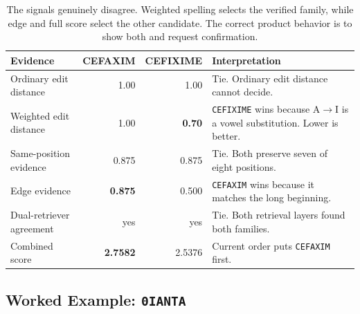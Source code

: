 \documentclass[11pt,a4paper]{article}
\newcommand{\code}[1]{\texttt{#1}}
\begin{document}
\begin{table}[H]
\centering
\small
\begin{tabularx}{\linewidth}{@{}lrrY@{}}
\toprule
\textbf{Evidence} & \textbf{CEFAXIM} & \textbf{CEFIXIME} & \textbf{Interpretation} \\
\midrule
Ordinary edit distance & 1.00 & 1.00 & Tie. Ordinary edit distance cannot decide. \\
Weighted edit distance & 1.00 & \textbf{0.70} & \code{CEFIXIME} wins because A$\rightarrow$I is a vowel substitution. Lower is better. \\
Same-position evidence & 0.875 & 0.875 & Tie. Both preserve seven of eight positions. \\
Edge evidence & \textbf{0.875} & 0.500 & \code{CEFAXIM} wins because it matches the long beginning. \\
Dual-retriever agreement & yes & yes & Tie. Both retrieval layers found both families. \\
Combined score & \textbf{2.7582} & 2.5376 & Current order puts \code{CEFAXIM} first. \\
\bottomrule
\end{tabularx}
\caption{The signals genuinely disagree. Weighted spelling selects the verified family, while edge and full score select the other candidate. The correct product behavior is to show both and request confirmation.}
\label{tab:cefaxime}
\end{table}

\subsection{Worked Example: \code{0IANTA}}
\end{document}
